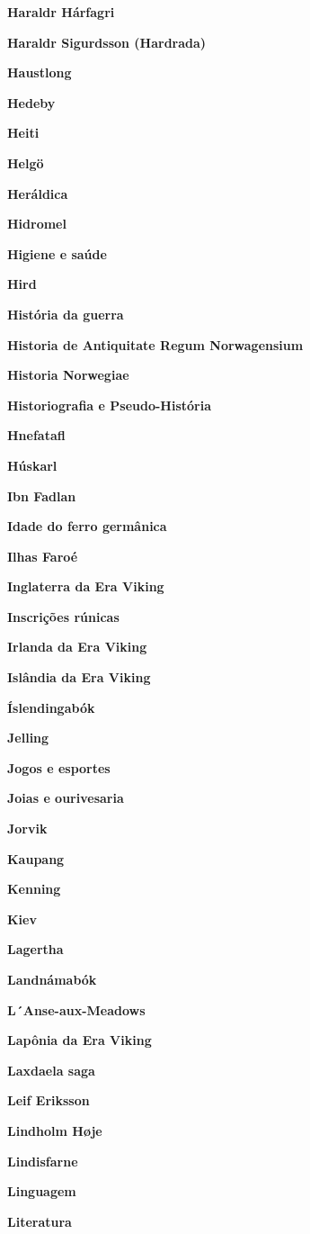 \textbf{Haraldr Hárfagri}

\textbf{Haraldr Sigurdsson (Hardrada)}

\textbf{Haustlong}

\textbf{Hedeby}

\textbf{Heiti}

\textbf{Helgö}

\textbf{Heráldica}

\textbf{Hidromel}

\textbf{Higiene e saúde}

\textbf{Hird}

\textbf{História da guerra}

\textbf{Historia de Antiquitate Regum Norwagensium}

\textbf{Historia Norwegiae}

\textbf{Historiografia e Pseudo-História}

\textbf{Hnefatafl}

\textbf{Húskarl}

\textbf{Ibn Fadlan}

\textbf{Idade do ferro germânica}

\textbf{Ilhas Faroé}

\textbf{Inglaterra da Era Viking}

\textbf{Inscrições rúnicas}

\textbf{Irlanda da Era Viking}

\textbf{Islândia da Era Viking}

\textbf{Íslendingabók}

\textbf{Jelling}

\textbf{Jogos e esportes}

\textbf{Joias e ourivesaria}

\textbf{Jorvik}

\textbf{Kaupang}

\textbf{Kenning}

\textbf{Kiev}

\textbf{Lagertha}

\textbf{Landnámabók}

\textbf{L´Anse-aux-Meadows}

\textbf{Lapônia da Era Viking}

\textbf{Laxdaela saga}

\textbf{Leif Eriksson}

\textbf{Lindholm Høje}

\textbf{Lindisfarne}

\textbf{Linguagem}

\textbf{Literatura}

